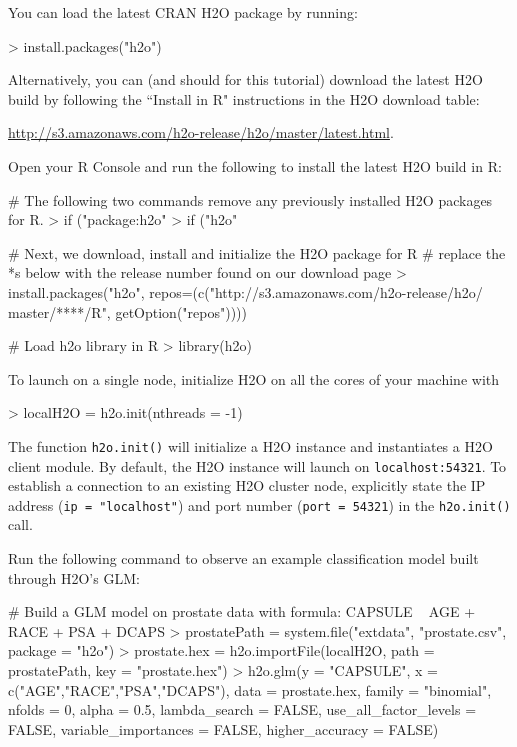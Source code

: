 \documentclass[11pt]{article}
\begin{document}
You can load the latest CRAN H2O package by running:

\begin{spverbatim}
> install.packages("h2o")
\end{spverbatim}
\bigskip
\noindent
Alternatively, you can (and should for this tutorial) download the latest H2O build by following the ``Install in R" instructions in the H2O download table:

\indent \indent \indent \url{http://s3.amazonaws.com/h2o-release/h2o/master/latest.html}.

\noindent
Open your R Console and run the following to install the latest H2O build in R:

\begin{spverbatim}
# The following two commands remove any previously installed H2O packages for R.
> if ("package:h2o" %
> if ("h2o" %

# Next, we download, install and initialize the H2O package for R
# replace the *s below with the release number found on our download page
> install.packages("h2o", repos=(c("http://s3.amazonaws.com/h2o-release/h2o/
master/****/R", getOption("repos"))))

# Load h2o library in R
> library(h2o)

\end{spverbatim}
\noindent
To launch on a single node, initialize H2O on all the cores of your machine with

\begin{spverbatim}
> localH2O = h2o.init(nthreads = -1)

\end{spverbatim}
\noindent
The function \texttt{h2o.init()} will initialize a H2O instance and instantiates a H2O client module. By default, the H2O instance will launch on \texttt{localhost:54321}. To establish a connection to an existing H2O cluster node, explicitly state the IP address (\texttt{ip = "localhost"}) and port number (\texttt{port = 54321}) in the \texttt{h2o.init()} call.

\noindent
Run the following command to observe an example classification model built through H2O's GLM:

\begin{spverbatim}
# Build a GLM model on prostate data with formula: CAPSULE ~ AGE + RACE + PSA + DCAPS
> prostatePath = system.file("extdata", "prostate.csv", package = "h2o")
> prostate.hex = h2o.importFile(localH2O, path = prostatePath, key = "prostate.hex")
> h2o.glm(y = "CAPSULE", x = c("AGE","RACE","PSA","DCAPS"), data = prostate.hex, family = "binomial", nfolds = 0, alpha = 0.5, lambda_search = FALSE,  
use_all_factor_levels = FALSE, variable_importances = FALSE, higher_accuracy = FALSE)
\end{spverbatim}
\end{document}

